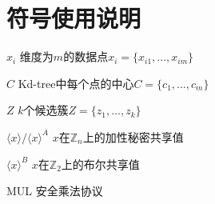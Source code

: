 \chapter*{符号使用说明}

\begin{denotation}
%	
%
%	
\item[$ x_i $ ] 维度为$ m $的数据点$ x_i =\{x_{i1},...,x_{im}\}  $
\item[$ C $ ] Kd-tree中每个点的中心$ C = \{c_1,...,c_m\}  $
\item[$ Z $ ] $ k $个候选簇$ Z = \{z_1,...,z_k\} $
\item[$ \langle x \rangle/\langle x \rangle^A $] $ x $在$ \mathbb{Z}_n $上的加性秘密共享值
\item[$ \langle x \rangle^B $ ] $ x $在$ \mathbb{Z}_2 $上的布尔共享值
\item[MUL] 安全乘法协议

\end{denotation}
